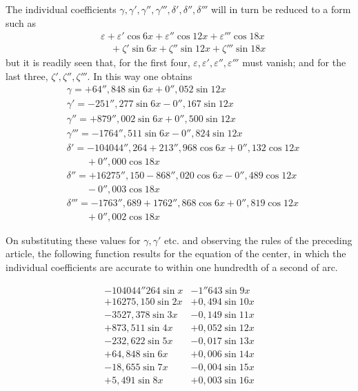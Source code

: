 The individual coefficients \(\gamma,\gamma',\gamma'',\gamma''',\delta',\delta'',\delta'''\) will in turn be reduced to a form such as
\[
\begin{aligned}
&\varepsilon+\varepsilon'\cos 6x+\varepsilon''\cos 12x+\varepsilon'''\cos 18x\\[6pt]
&\quad+\zeta'\sin 6x+\zeta''\sin 12x+\zeta'''\sin 18x
\end{aligned}
\]
but it is readily seen that, for the first four, \(\varepsilon,\varepsilon',\varepsilon'',\varepsilon'''\) must vanish; and for the last three, \(\zeta',\zeta'',\zeta'''\). In this way one obtains
\[
\begin{aligned}
&\gamma=+64''{,}848\sin 6x+0''{,}052\sin 12x\\[6pt]
&\gamma'=-251''{,}277\sin 6x-0''{,}167\sin 12x\\[6pt]
&\gamma''=+879''{,}002\sin 6x+0''{,}500\sin 12x\\[6pt]
&\gamma'''=-1764''{,}511\sin 6x-0''{,}824\sin 12x\\[6pt]
&\delta'=-104044''{,}264+213''{,}968\cos 6x+0''{,}132\cos 12x\\[6pt]
&\qquad{}+0''{,}000\cos 18x\\[6pt]
&\delta''=+16275''{,}150-868''{,}020\cos 6x-0''{,}489\cos 12x\\[6pt]
&\qquad{}-0''{,}003\cos 18x\\[6pt]
&\delta'''=-1763''{,}689+1762''{,}868\cos 6x+0''{,}819\cos 12x\\[6pt]
&\qquad{}+0''{,}002\cos 18x
\end{aligned}
\]

On substituting these values for \(\gamma,\gamma'\) etc. and observing the rules of the preceding article, the following function results for the equation of the center, in which the individual coefficients are accurate to within one hundredth of a second of arc.


\[
\begin{array}{r|r}
-104044''264\sin x&-1''643\sin 9x\\
+16275{,}150\sin 2x&+0{,}494\sin 10x\\
-3527{,}378\sin 3x&-0{,}149\sin 11x\\
+873{,}511\sin 4x&+0{,}052\sin 12x\\
-232{,}622\sin 5x&-0{,}017\sin 13x\\
+64{,}848\sin 6x&+0{,}006\sin 14x\\
-18{,}655\sin 7x&-0{,}004\sin 15x\\
+5{,}491\sin 8x&+0{,}003\sin 16x
\end{array}
\]



